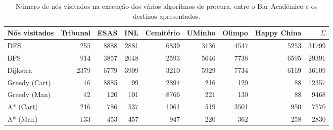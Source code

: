 \documentclass[12pt, a4paper, titlepage]{article}
\begin{document}
\begin{table}[H]
    \small

    \begin{adjustwidth}{-1.5cm}{-1.5cm}
        \begin{center}
            \begin{tabular}{|l|r|r|r|r|r|r|r|r|}
                \hline
                    Nós visitados &
                    Tribunal      &
                    ESAS          &
                    INL           &
                    Cemitério     &
                    UMinho        &
                    Olimpo        &
                    Happy China   &
                    $\Sigma$      \\

                \hline
                DFS & 255 & 8888 & 2881 & 6839 & 3136 & 4547 & 5253 & 31799 \\
                \hline
                BFS & 914 & 3857 & 2048 & 2593 & 5646 & 7738 & 6595 & 29391 \\
                \hline
                Dijkstra & 2379 & 6779 & 3909 & 3210 & 5929 & 7734 & 6169 & 36109 \\
                \hline
                Greedy (Cart) & 46 & 8885 & 99 & 2894 & 216 & 129 & 88 & 12357 \\
                \hline
                Greedy (Man) & 42 & 120 & 101 & 8766 & 221 & 130 & 88 & 9468 \\
                \hline
                A* (Cart) & 216 & 786 & 537 & 1061 & 519 & 3501 & 950 & 7570 \\
                \hline
                A* (Man) & 133 & 453 & 457 & 947 & 220 & 362 & 258 & 2830 \\
                \hline
            \end{tabular}
        \end{center}
    \end{adjustwidth}

    \caption{
        Número de nós visitados na execução dos vários algoritmos de procura, entre o Bar Académico
        e os destinos apresentados.
    }
\end{table}
\end{document}
